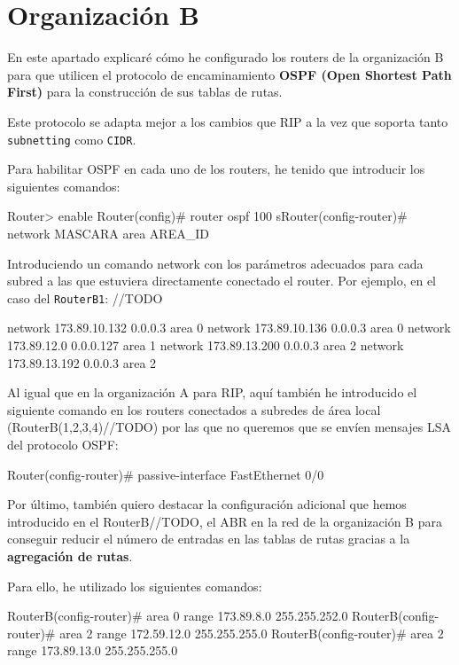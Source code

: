 \section{Organización B}
\par En este apartado explicaré cómo he configurado los routers de la organización B para que utilicen el protocolo de encaminamiento \textbf{OSPF (Open Shortest Path First)} para la construcción de sus tablas de rutas.
\par Este protocolo se adapta mejor a los cambios que RIP a la vez que soporta tanto \texttt{subnetting} como \texttt{CIDR}.
\par Para habilitar OSPF en cada uno de los routers, he tenido que introducir los siguientes comandos:
\begin{listing}[style=consola]
Router> enable
Router(config)# router ospf 100
sRouter(config-router)# network MASCARA area AREA_ID
\end{listing}
\par Introduciendo un comando network con los parámetros adecuados para cada subred a las que estuviera directamente conectado el router. Por ejemplo, en el caso del \texttt{RouterB1}: //TODO
\begin{listing}[style=consola]
network 173.89.10.132 0.0.0.3 area 0
network 173.89.10.136 0.0.0.3 area 0
network 173.89.12.0 0.0.0.127 area 1
network 173.89.13.200 0.0.0.3 area 2
network 173.89.13.192 0.0.0.3 area 2
\end{listing}
\par Al igual que en la organización A para RIP, aquí también he introducido el siguiente comando en los routers conectados a subredes de área local (RouterB(1,2,3,4)//TODO) por las que no queremos que se envíen mensajes LSA del protocolo OSPF:
\begin{listing}[style=consola]
Router(config-router)# passive-interface FastEthernet 0/0
\end{listing}
\par Por último, también quiero destacar la configuración adicional que hemos introducido en el RouterB//TODO, el ABR en la red de la organización B para conseguir reducir el número de entradas en las tablas de rutas gracias a la \textbf{agregación de rutas}.
\par Para ello, he utilizado los siguientes comandos:
\begin{listing}[style=consola]
RouterB(config-router)# area 0 range 173.89.8.0 255.255.252.0
RouterB(config-router)# area 2 range 172.59.12.0 255.255.255.0
RouterB(config-router)# area 2 range 173.89.13.0 255.255.255.0
\end{listing}
